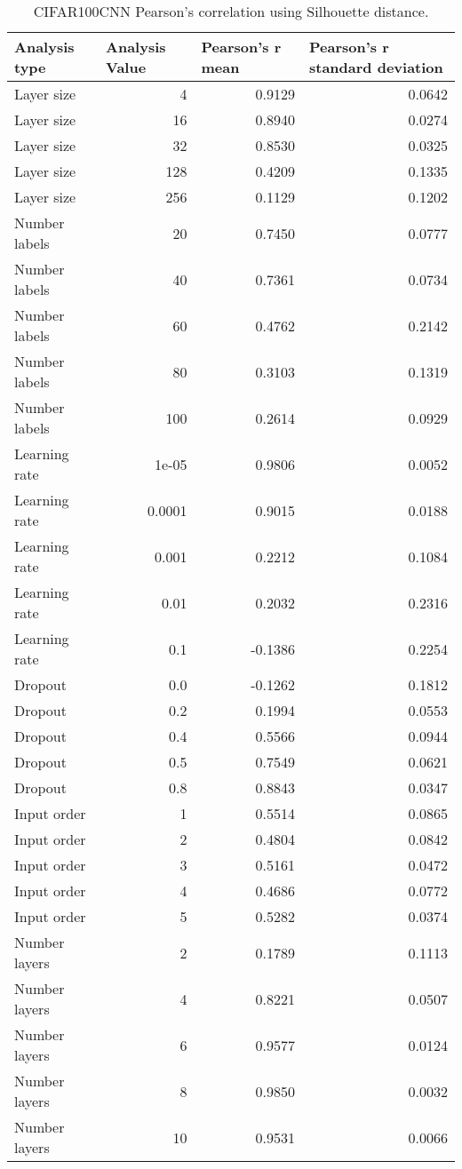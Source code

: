 \documentclass{article}
\begin{document}
\begin{table}[H]
\centering
\begin{tabular}{@{}lrrr@{}}
\toprule
Analysis type & \multicolumn{1}{l}{Analysis Value} & \multicolumn{1}{l}{Pearson's r mean} & \multicolumn{1}{l}{Pearson's r standard deviation} \\ \midrule
Layer size & 4 & 0.9129 & 0.0642 \\ 
Layer size & 16 & 0.8940 & 0.0274 \\ 
Layer size & 32 & 0.8530 & 0.0325 \\ 
Layer size & 128 & 0.4209 & 0.1335 \\ 
Layer size & 256 & 0.1129 & 0.1202 \\ 
Number labels & 20 & 0.7450 & 0.0777 \\ 
Number labels & 40 & 0.7361 & 0.0734 \\ 
Number labels & 60 & 0.4762 & 0.2142 \\ 
Number labels & 80 & 0.3103 & 0.1319 \\ 
Number labels & 100 & 0.2614 & 0.0929 \\ 
Learning rate & 1e-05 & 0.9806 & 0.0052 \\ 
Learning rate & 0.0001 & 0.9015 & 0.0188 \\ 
Learning rate & 0.001 & 0.2212 & 0.1084 \\ 
Learning rate & 0.01 & 0.2032 & 0.2316 \\ 
Learning rate & 0.1 & -0.1386 & 0.2254 \\ 
Dropout & 0.0 & -0.1262 & 0.1812 \\ 
Dropout & 0.2 & 0.1994 & 0.0553 \\ 
Dropout & 0.4 & 0.5566 & 0.0944 \\ 
Dropout & 0.5 & 0.7549 & 0.0621 \\ 
Dropout & 0.8 & 0.8843 & 0.0347 \\ 
Input order & 1 & 0.5514 & 0.0865 \\ 
Input order & 2 & 0.4804 & 0.0842 \\ 
Input order & 3 & 0.5161 & 0.0472 \\ 
Input order & 4 & 0.4686 & 0.0772 \\ 
Input order & 5 & 0.5282 & 0.0374 \\ 
Number layers & 2 & 0.1789 & 0.1113 \\ 
Number layers & 4 & 0.8221 & 0.0507 \\ 
Number layers & 6 & 0.9577 & 0.0124 \\ 
Number layers & 8 & 0.9850 & 0.0032 \\ 
Number layers & 10 & 0.9531 & 0.0066 \\ 
\bottomrule
\end{tabular}
\caption{CIFAR100CNN Pearson's correlation using Silhouette distance.}
\end{table}
\end{document}

